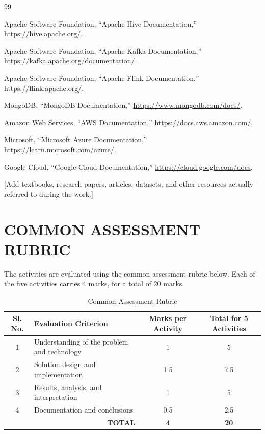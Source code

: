 \documentclass[12pt,a4paper]{report}
\begin{document}
\clearpage
{}
\begin{thebibliography}{99}

Apache Software Foundation, ``Apache Hive Documentation,''
\url{https://hive.apache.org/}.

Apache Software Foundation, ``Apache Kafka Documentation,''
\url{https://kafka.apache.org/documentation/}.

Apache Software Foundation, ``Apache Flink Documentation,''
\url{https://flink.apache.org/}.

MongoDB, ``MongoDB Documentation,''
\url{https://www.mongodb.com/docs/}.

Amazon Web Services, ``AWS Documentation,''
\url{https://docs.aws.amazon.com/}.

Microsoft, ``Microsoft Azure Documentation,''
\url{https://learn.microsoft.com/azure/}.

Google Cloud, ``Google Cloud Documentation,''
\url{https://cloud.google.com/docs}.

[Add textbooks, research papers, articles, datasets, and other resources
actually referred to during the work.]

\end{thebibliography}

\appendix
\chapter{COMMON ASSESSMENT RUBRIC}

The activities are evaluated using the common assessment rubric below.
Each of the five activities carries 4 marks, for a total of 20 marks.

\begin{table}[H]
\centering
\caption{Common Assessment Rubric}
\begin{tabularx}{\textwidth}{|c|X|c|c|}
\hline
\textbf{Sl. No.} & \textbf{Evaluation Criterion} &
\textbf{Marks per Activity} & \textbf{Total for 5 Activities}\\
\hline
1 & Understanding of the problem and technology & 1 & 5\\
\hline
2 & Solution design and implementation & 1.5 & 7.5\\
\hline
3 & Results, analysis, and interpretation & 1 & 5\\
\hline
4 & Documentation and conclusions & 0.5 & 2.5\\
\hline
\multicolumn{2}{|r|}{\textbf{TOTAL}} & \textbf{4} & \textbf{20}\\
\hline
\end{tabularx}
\end{table}
\end{document}
